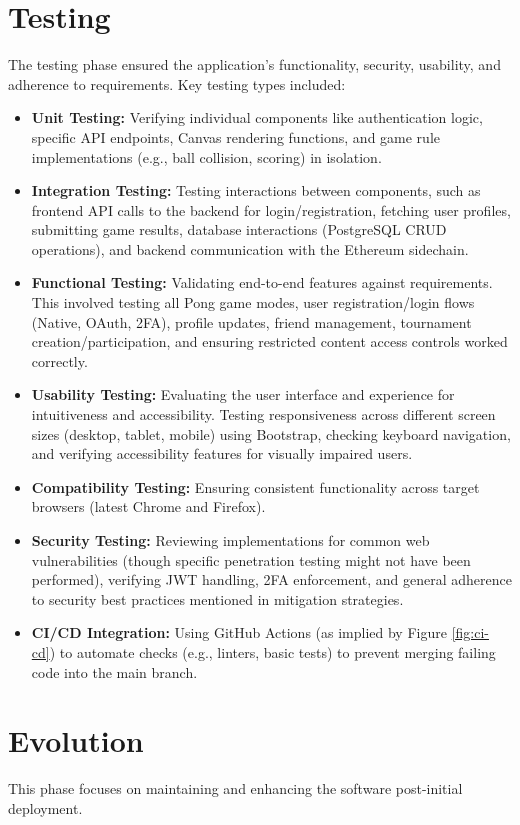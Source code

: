 \section{Testing}
The testing phase ensured the application's functionality, security, usability, and adherence to requirements. Key testing types included:
\begin{itemize}
    \item \textbf{Unit Testing:} Verifying individual components like authentication logic, specific API endpoints, Canvas rendering functions, and game rule implementations (e.g., ball collision, scoring) in isolation.
    \item \textbf{Integration Testing:} Testing interactions between components, such as frontend API calls to the backend for login/registration, fetching user profiles, submitting game results, database interactions (PostgreSQL CRUD operations), and backend communication with the Ethereum sidechain.
    \item \textbf{Functional Testing:} Validating end-to-end features against requirements. This involved testing all Pong game modes, user registration/login flows (Native, OAuth, 2FA), profile updates, friend management, tournament creation/participation, and ensuring restricted content access controls worked correctly.
    \item \textbf{Usability Testing:} Evaluating the user interface and experience for intuitiveness and accessibility. Testing responsiveness across different screen sizes (desktop, tablet, mobile) using Bootstrap, checking keyboard navigation, and verifying accessibility features for visually impaired users.
    \item \textbf{Compatibility Testing:} Ensuring consistent functionality across target browsers (latest Chrome and Firefox).
    \item \textbf{Security Testing:} Reviewing implementations for common web vulnerabilities (though specific penetration testing might not have been performed), verifying JWT handling, 2FA enforcement, and general adherence to security best practices mentioned in mitigation strategies.
    \item \textbf{CI/CD Integration:} Using GitHub Actions (as implied by Figure \ref{fig:ci-cd}) to automate checks (e.g., linters, basic tests) to prevent merging failing code into the main branch.
\end{itemize}

\section{Evolution}
This phase focuses on maintaining and enhancing the software post-initial deployment.
